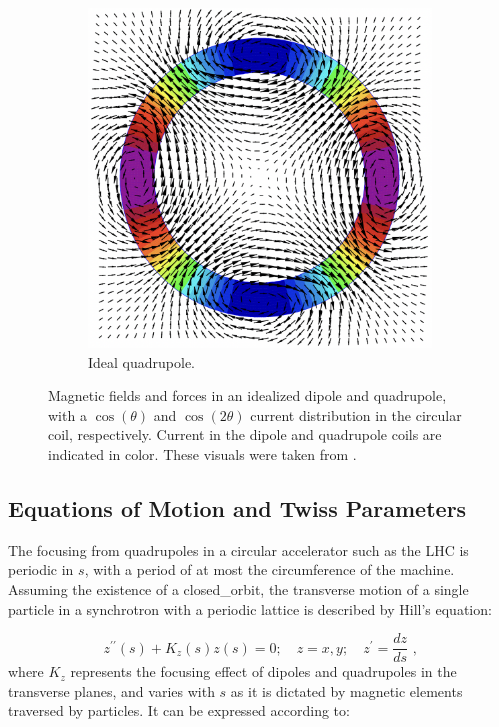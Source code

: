 \begin{figure}[!hbt]
\begin{subfigure}[b]{0.45\textwidth}
        \includegraphics[width=\textwidth]{Figures/Beam_Dynamics_Theory/ideal_quadrupole_cos_2theta.png}
        \caption{Ideal quadrupole.}
        \label{fig:ideal_quadrupole}
    \end{subfigure}
    \caption{Magnetic fields and forces in an idealized dipole and quadrupole, with a \(\cos(\theta)\) and \(\cos(2\theta)\) current distribution in the circular coil, respectively. Current in the dipole and quadrupole coils are indicated in color. These visuals were taken from \cite{CERN:Russenschuck:CAS_Design_Magnets}.}
    \label{figure:dipole_quadrupole_fields}
\end{figure}

\subsection{Equations of Motion and Twiss Parameters}
\label{subsection:equations_of_motion_and_twiss_parameters}

The focusing from quadrupoles in a circular accelerator such as the \gls{LHC} is periodic in \(s\), with a period of at most the circumference of the machine.
Assuming the existence of a \gls{closed_orbit}, the transverse motion of a single particle in a synchrotron with a periodic lattice is described by Hill's equation:

\begin{equation}
    z^{\prime \prime}(s) + K_z(s) z(s) = 0; \quad z = x, y; \quad z^{\prime} = \dfrac{dz}{ds} \text{ ,}
    \label{equation:hill_equation}
\end{equation}
where \(K_z\) represents the focusing effect of dipoles and quadrupoles in the transverse planes, and varies with \(s\) as it is dictated by magnetic elements traversed by particles.
It can be expressed according to:

